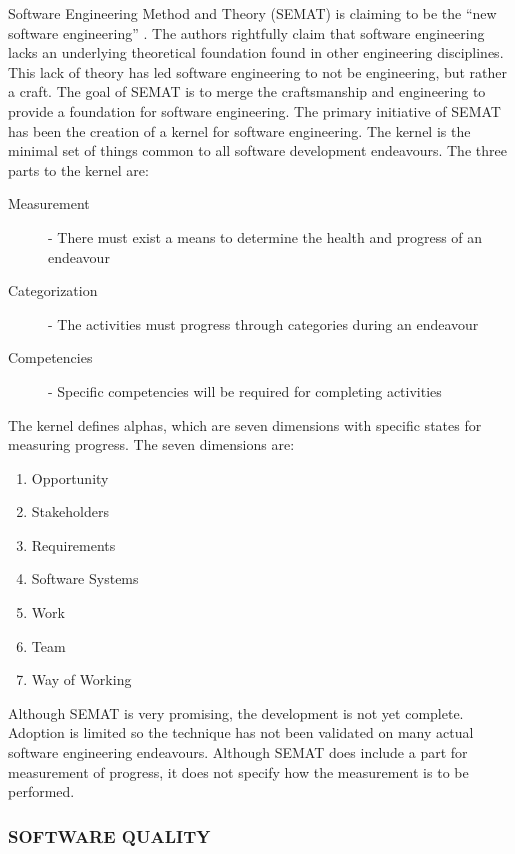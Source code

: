 \documentclass[SDSUThesis.tex]{subfiles}
\begin{document}
    Software Engineering Method and Theory (SEMAT) is claiming to 
    be the ``new software engineering'' 
    \cite{Jacobson2014}. 
    The authors rightfully claim that 
    software engineering lacks
    an underlying theoretical foundation found in other 
    engineering disciplines.  This lack of theory
    has led software engineering to not be engineering, but 
    rather a craft.  The goal of 
    SEMAT is to merge the craftsmanship and engineering to 
    provide a foundation for software
    engineering.  The primary initiative of SEMAT 
    has been the creation of a kernel for 
    software engineering.  The kernel is the minimal set 
    of things common to all software development
    endeavours. The three parts to the kernel are:
    \begin{description}
        \item[Measurement] - There must exist a means to 
            determine the health and progress of an endeavour
        \item[Categorization]-  The activities must progress 
            through categories during an endeavour
        \item[Competencies] - Specific competencies will 
            be required for completing activities
    \end{description}
    
    The kernel defines alphas, which are seven dimensions with
    specific states for measuring progress. 
    The seven dimensions are: 
    \begin{enumerate}
        \item Opportunity
        \item Stakeholders
        \item Requirements
        \item Software Systems
        \item Work
        \item Team
        \item Way of Working
    \end{enumerate}
    
    Although SEMAT is very promising, the development is not yet complete.  Adoption is
    limited so the technique has not been validated on many
    actual software engineering endeavours.  Although SEMAT does include a part for
    measurement of progress, it does not specify how the measurement is to be 
    performed.

\subsubsection{SOFTWARE QUALITY}
\end{document}
